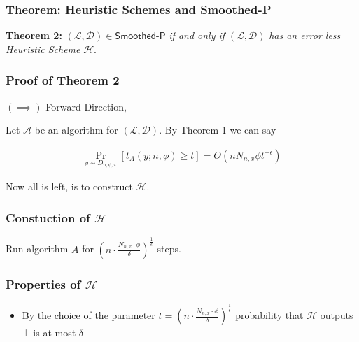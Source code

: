 \begin{frame}
    \frametitle{Theorem: Heuristic Schemes and \textsf{Smoothed-P}}

    \textbf{Theorem 2:} $(\mathcal{L}, \mathcal{D}) \in \textsf{Smoothed-P}$ \textit{if and only if} $(\mathcal{L}, \mathcal{D})$ \textit{has an error less Heuristic Scheme} $\mathcal{H}$.

\end{frame}

\begin{frame}
    \frametitle{Proof of Theorem 2}

    $(\implies)$ Forward Direction,

    Let $\mathcal{A}$ be an algorithm for $(\mathcal{L}, \mathcal{D})$. By Theorem
    1 we can say

    \begin{align*}
        \Pr_{y \sim D_{n, \phi, x}}[t_A(y;n, \phi) \geq t] = O(n N_{n,x} \phi t^{-\epsilon})
    \end{align*}

    Now all is left, is to construct $\mathcal{H}$.
\end{frame}

\begin{frame}
    \frametitle{Constuction of $\mathcal{H}$}

    \begin{algorithm}[H]
        \caption{$\mathcal{H}$}

        Run algorithm $A$ for $(n \cdot \frac{N_{n, x} \cdot \phi}{\delta}) ^{\frac{1}{\epsilon}}$ steps.\\
    \end{algorithm}

\end{frame}


\begin{frame}
    \frametitle{Properties of $\mathcal{H}$}

    \begin{itemize}
        \item By the choice of the parameter $t = (n \cdot \frac{N_{n, x} \cdot \phi}{\delta}) ^{\frac{1}{\epsilon}}$ probability that $\mathcal{H}$ outputs $\bot$ is at most $\delta$
    \end{itemize}

\end{frame}

